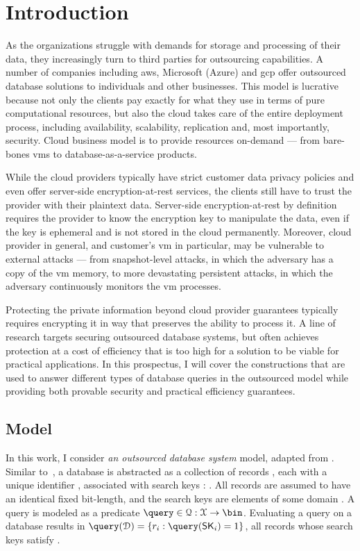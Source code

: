 \chapter{Introduction}
\thispagestyle{myheadings}

	As the organizations struggle with demands for storage and processing of their data, they increasingly turn to third parties for outsourcing capabilities.
	A number of companies including \Gls{aws}, Microsoft (Azure) and  \Gls{gcp} offer outsourced database solutions to individuals and other businesses.
	This model is lucrative because not only the clients pay exactly for what they use in terms of pure computational resources, but also the cloud takes care of the entire deployment process, including availability, scalability, replication and, most importantly, security.
	Cloud business model is to provide resources on-demand --- from bare-bones \Glspl{vm} to database-as-a-service products.

	While the cloud providers typically have strict customer data privacy policies and even offer server-side encryption-at-rest services, the clients still have to trust the provider with their plaintext data.
	Server-side encryption-at-rest by definition requires the provider to know the encryption key to manipulate the data, even if the key is ephemeral and is not stored in the cloud permanently.
	Moreover, cloud provider in general, and customer's \Gls{vm} in particular, may be vulnerable to external attacks --- from snapshot-level attacks, in which the adversary has a copy of the \Gls{vm} memory, to more devastating persistent attacks, in which the adversary continuously monitors the \Gls{vm} processes.

	Protecting the private information beyond cloud provider guarantees typically requires encrypting it in way that preserves the ability to process it.
	A line of research targets securing outsourced database systems, but often achieves protection at a cost of efficiency that is too high for a solution to be viable for practical applications.
	In this prospectus, I will cover the constructions that are used to answer different types of database queries in the outsourced model while providing both provable security and practical efficiency guarantees.

	\section{Model}

		In this work, I consider \emph{an outsourced database system} model, adapted from \cite{generic-attacks-kellaris}.
		Similar to~\cite{epsolute}, a database is abstracted as a collection of \dataSize{} records \record{}, each with a unique identifier \recordID{}, associated with search keys \searchKey{}: \databaseDef{}.
		All records are assumed to have an identical fixed bit-length, and the search keys are elements of some domain \searchKeyDomain{}.
		A query is modeled as a predicate $\query \in \querySet: \searchKeyDomain \to \bin$.
		Evaluating a query \query{} on a database \database{} results in $\query( \database ) = \{ \record_i : \query( \searchKey_i ) = 1 \}$, all records whose search keys satisfy \query{}.


